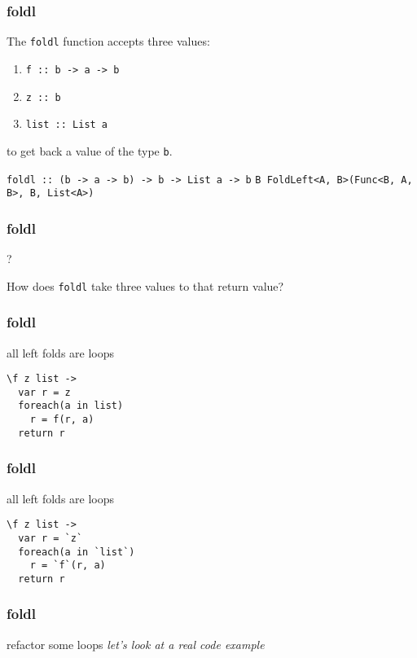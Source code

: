 \begin{frame}
\frametitle{foldl}
The \lstinline[basicstyle=\ttfamily]$foldl$ function accepts three values:
\begin{enumerate}
\item \lstinline[basicstyle=\ttfamily]$f :: b -> a -> b$
\item \lstinline[basicstyle=\ttfamily]$z :: b$
\item \lstinline[basicstyle=\ttfamily]$list :: List a$
\end{enumerate}
to get back a value of the type \lstinline[basicstyle=\ttfamily]$b$.

\hrulefill

\lstinline[basicstyle=\ttfamily]$foldl :: (b -> a -> b) -> b -> List a -> b$
\lstinline[basicstyle=\ttfamily]$B FoldLeft<A, B>(Func<B, A, B>, B, List<A>)$
\end{frame}

\begin{frame}
\frametitle{foldl}
\begin{block}{?}
\begin{center}
How does \lstinline[basicstyle=\ttfamily]$foldl$ take three values to that return value?
\end{center}
\end{block}
\end{frame}

\begin{frame}[fragile]
\frametitle{foldl}
\begin{block}{all left folds are loops}
\begin{lstlisting}[style=haskell,basicstyle=\scriptsize\ttfamily,mathescape]
\f z list ->
  var r = z
  foreach(a in list)
    r = f(r, a)
  return r
\end{lstlisting}
\end{block}
\end{frame}

\begin{frame}[fragile]
\frametitle{foldl}
\begin{block}{all left folds are loops}
\begin{lstlisting}[style=haskell,basicstyle=\scriptsize\ttfamily,mathescape]
\f z list ->
  var r = `z`
  foreach(a in `list`)
    r = `f`(r, a)
  return r
\end{lstlisting}
\end{block}
\end{frame}

\begin{frame}[fragile]
\frametitle{foldl}
\begin{block}{refactor some loops}
\emph{let's look at a real code example}
\end{block}
\end{frame}

